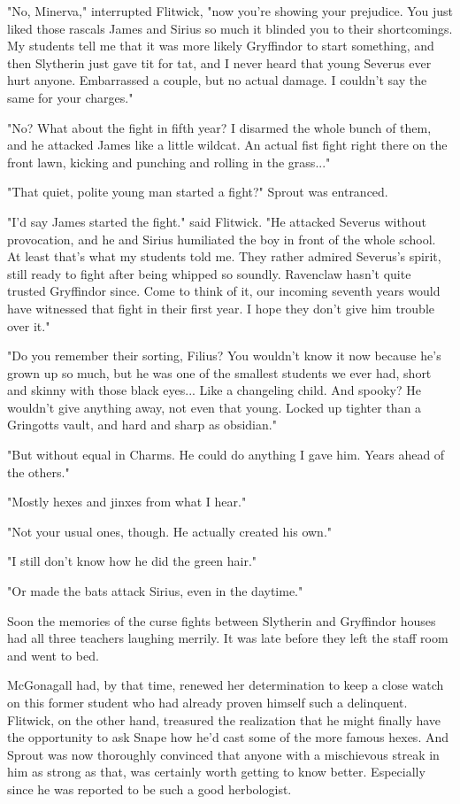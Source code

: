 "No, Minerva," interrupted Flitwick, "now you're showing your prejudice. You just liked those rascals James and Sirius so much it blinded you to their shortcomings. My students tell me that it was more likely Gryffindor to start something, and then Slytherin just gave tit for tat, and I never heard that young Severus ever hurt anyone. Embarrassed a couple, but no actual damage. I couldn't say the same for your charges."

"No? What about the fight in fifth year? I disarmed the whole bunch of them, and he attacked James like a little wildcat. An actual fist fight right there on the front lawn, kicking and punching and rolling in the grass..."

"That quiet, polite young man started a fight?" Sprout was entranced.

"I'd say James started the fight." said Flitwick. "He attacked Severus without provocation, and he and Sirius humiliated the boy in front of the whole school. At least that's what my students told me. They rather admired Severus's spirit, still ready to fight after being whipped so soundly. Ravenclaw hasn't quite trusted Gryffindor since. Come to think of it, our incoming seventh years would have witnessed that fight in their first year. I hope they don't give him trouble over it."

"Do you remember their sorting, Filius? You wouldn't know it now because he's grown up so much, but he was one of the smallest students we ever had, short and skinny with those black eyes... Like a changeling child. And spooky? He wouldn't give anything away, not even that young. Locked up tighter than a Gringotts vault, and hard and sharp as obsidian."

"But without equal in Charms. He could do anything I gave him. Years ahead of the others."

"Mostly hexes and jinxes from what I hear."

"Not your usual ones, though. He actually created his own."

"I still don't know how he did the green hair."

"Or made the bats attack Sirius, even in the daytime."

Soon the memories of the curse fights between Slytherin and Gryffindor houses had all three teachers laughing merrily. It was late before they left the staff room and went to bed.

McGonagall had, by that time, renewed her determination to keep a close watch on this former student who had already proven himself such a delinquent. Flitwick, on the other hand, treasured the realization that he might finally have the opportunity to ask Snape how he'd cast some of the more famous hexes. And Sprout was now thoroughly convinced that anyone with a mischievous streak in him as strong as that, was certainly worth getting to know better. Especially since he was reported to be such a good herbologist.

